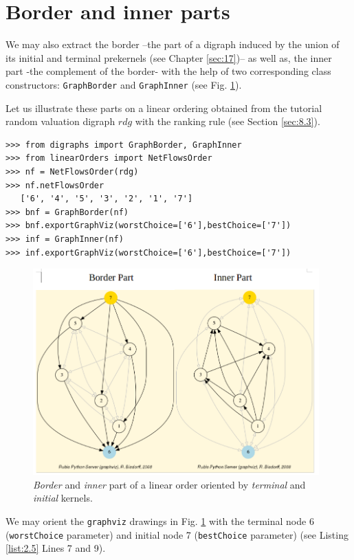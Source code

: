\section{Border and inner parts}
\label{sec:2.4}

We may also extract the border --the part of a digraph induced by the union of its initial and terminal prekernels (see Chapter \ref{sec:17})--  as well as, the inner part -the complement of the border- with the help of two corresponding class constructors: \texttt{GraphBorder} and \texttt{GraphInner} (see Fig. \ref{fig:2.3}).

Let us illustrate these parts on a linear ordering obtained from the tutorial random valuation digraph $rdg$  with the \NetFlows ranking rule  (see Section \ref{sec:8.3}).  
\begin{lstlisting}[caption={Border and inner part of a linear order},label=list:2.5]
>>> from digraphs import GraphBorder, GraphInner
>>> from linearOrders import NetFlowsOrder
>>> nf = NetFlowsOrder(rdg)
>>> nf.netFlowsOrder
   ['6', '4', '5', '3', '2', '1', '7']
>>> bnf = GraphBorder(nf)
>>> bnf.exportGraphViz(worstChoice=['6'],bestChoice=['7'])
>>> inf = GraphInner(nf)
>>> inf.exportGraphViz(worstChoice=['6'],bestChoice=['7'])
\end{lstlisting}
\begin{figure}[h]
\includegraphics[width=11cm]{Figures/graphBorderAndInner1.png}
\caption{\emph{Border} and \emph{inner} part of a linear order oriented by \emph{terminal} and \emph{initial} kernels.}
\label{fig:2.3}       %
\end{figure}
We may orient the \texttt{graphviz} drawings in Fig. \ref{fig:2.3}  with the terminal node 6 (\texttt{worstChoice} parameter) and initial node 7 (\texttt{bestChoice} parameter) (see Listing \ref{list:2.5} Lines 7 and 9).

